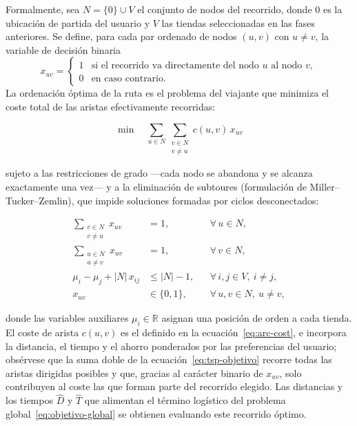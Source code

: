 Formalmente, sea $N = \{0\} \cup V$ el conjunto de nodos del recorrido, donde $0$ es la ubicaci\'on
de partida del usuario y $V$ las tiendas seleccionadas en las fases anteriores. Se define, para cada
par ordenado de nodos $(u,v)$ con $u \neq v$, la variable de decisi\'on binaria
\[
  x_{uv} =
  \begin{cases}
    1 & \text{si el recorrido va directamente del nodo } u \text{ al nodo } v,\\
    0 & \text{en caso contrario.}
  \end{cases}
\]
La ordenaci\'on \'optima de la ruta es el problema del viajante que minimiza el coste total de las
aristas efectivamente recorridas:

\begin{equation}\label{eq:tsp-objetivo}
  \min \quad \sum_{u \in N} \sum_{\substack{v \in N \\ v \neq u}} c(u,v)\, x_{uv}
\end{equation}

sujeto a las restricciones de grado ---cada nodo se abandona y se alcanza exactamente una vez--- y a
la eliminaci\'on de subtoures (formulaci\'on de Miller--Tucker--Zemlin), que impide soluciones
formadas por ciclos desconectados:

\begin{align}
  \sum_{\substack{v \in N \\ v \neq u}} x_{uv} &= 1, & &\forall\, u \in N, \label{eq:tsp-out}\\
  \sum_{\substack{u \in N \\ u \neq v}} x_{uv} &= 1, & &\forall\, v \in N, \label{eq:tsp-in}\\
  \mu_i - \mu_j + |N|\, x_{ij} &\le |N| - 1, & &\forall\, i,j \in V,\ i \neq j, \label{eq:tsp-mtz}\\
  x_{uv} &\in \{0,1\}, & &\forall\, u,v \in N,\ u \neq v, \label{eq:tsp-bin}
\end{align}

donde las variables auxiliares $\mu_i \in \mathbb{R}$ asignan una posici\'on de orden a cada tienda.
El coste de arista $c(u,v)$ es el definido en la ecuaci\'on~\eqref{eq:arc-cost}, e incorpora la
distancia, el tiempo y el ahorro ponderados por las preferencias del usuario; obs\'ervese que la
suma doble de la ecuaci\'on~\eqref{eq:tsp-objetivo} recorre todas las aristas dirigidas posibles y
que, gracias al car\'acter binario de $x_{uv}$, solo contribuyen al coste las que forman parte del
recorrido elegido. Las distancias y los tiempos $\widehat{D}$ y $\widehat{T}$ que alimentan el
t\'ermino log\'istico del problema global~\eqref{eq:objetivo-global} se obtienen evaluando este
recorrido \'optimo.

